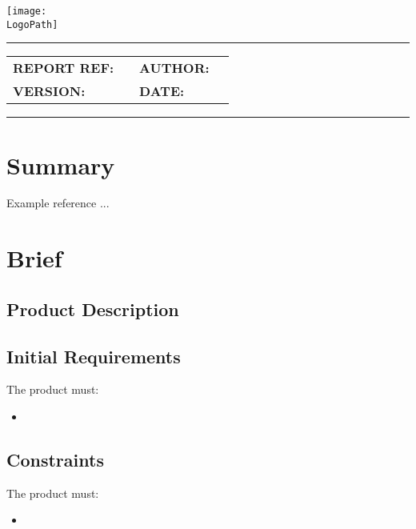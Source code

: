 \documentclass[10pt]{article}
\makeatletter
\newcommand{\customtitle}{%
  \noindent
  \begin{minipage}[t]{0.65\textwidth}
    \vspace{-0.5cm}
    {\ocrfamily\Large\bfseries \DocumentType \par}
  \end{minipage}%
  \begin{minipage}[t]{0.35\textwidth}
    \flushright{}
    \texttt{[image: \\LogoPath]}
  \end{minipage}

  \vspace{0.3cm}
  \hrule height 0.8pt
  \vspace{0.3cm}

  {\ocrfamily\bfseries\ProjectFullRef\par}
  {\ocrfamily\large\bfseries\ReportTitle\par}

  \vspace{0.5em}

  \begin{tabular}{@{}ll@{\hspace{2cm}}ll@{}}
    \ocrfamily\textbf{REPORT REF:} & \ocrfamily \ReportRef &
    \ocrfamily\textbf{AUTHOR:}     & \ocrfamily \AuthorName \\

    \ocrfamily\textbf{VERSION:}    & \ocrfamily \DocVersion &
    \ocrfamily\textbf{DATE:}       & \ocrfamily \ReleaseDate \\
  \end{tabular}

  \vspace{0.3cm}
  \hrule height 0.8pt
  \vspace{0.25cm}
}
\makeatother
\begin{document}
\vspace*{-1cm}
\thispagestyle{plain}
\customtitle{}


\section{Summary}

Example reference \cite{hibbeler2016mechanics}...

\section{Brief}

\subsection{Product Description}

\subsection{Initial Requirements}
The product must:
\begin{itemize}[leftmargin=*] %
	\item %
\end{itemize}

\subsection{Constraints}
The product must:
\begin{itemize}[leftmargin=*] %
	\item %
\end{itemize}
\end{document}
